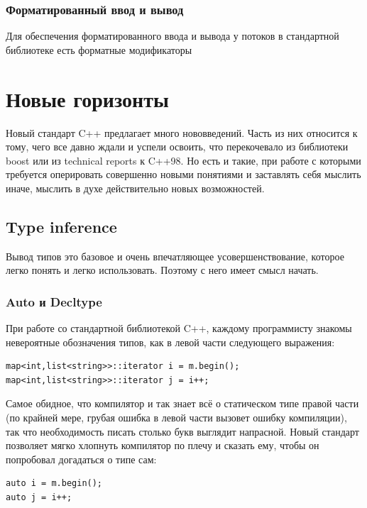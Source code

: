 \documentclass[a4paper,12pt,oneside]{article}
\begin{document}
\subsubsection{Форматированный ввод и вывод}

Для обеспечения форматированного ввода и вывода у потоков в стандартной библиотеке есть форматные модификаторы

\pagebreak
\section{Новые горизонты}

Новый стандарт C++ предлагает много нововведений. Часть из них относится к тому, чего все давно ждали и успели освоить, что перекочевало из библиотеки boost или из technical reports к C++98. Но есть и такие, при работе с которыми требуется оперировать совершенно новыми понятиями и заставлять себя мыслить иначе, мыслить в духе действительно новых возможностей.

\subsection{Type inference}

Вывод типов это базовое и очень впечатляющее усовершенствование, которое легко понять и легко использовать. Поэтому с него имеет смысл начать.

\subsubsection{Auto и Decltype}

При работе со стандартной библиотекой C++, каждому программисту знакомы невероятные обозначения типов, как в левой части следующего выражения:

\begin{lstlisting}
map<int,list<string>>::iterator i = m.begin(); 
map<int,list<string>>::iterator j = i++; 
\end{lstlisting}

Самое обидное, что компилятор и так знает всё о статическом типе правой части (по крайней мере, грубая ошибка в левой части вызовет ошибку компиляции), так что необходимость писать столько букв выглядит напрасной. Новый стандарт позволяет мягко хлопнуть компилятор по плечу и сказать ему, чтобы он попробовал догадаться о типе сам:

\begin{lstlisting}
auto i = m.begin(); 
auto j = i++;
\end{lstlisting}
\end{document}
